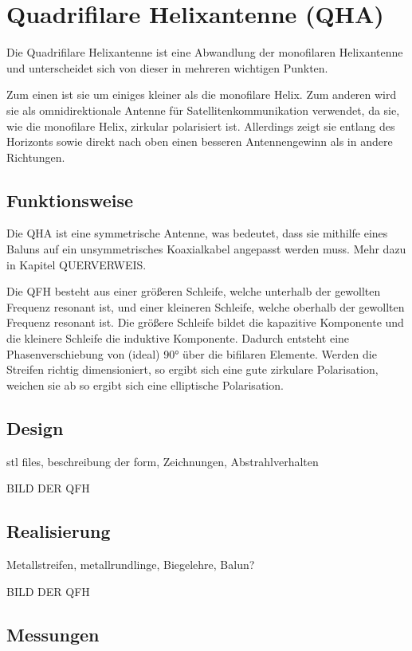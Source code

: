 \chapter{Quadrifilare Helixantenne (QHA)}
Die Quadrifilare Helixantenne ist eine Abwandlung der monofilaren Helixantenne und unterscheidet sich von dieser in mehreren wichtigen Punkten.

Zum einen ist sie um einiges kleiner als die monofilare Helix. Zum anderen wird sie als omnidirektionale Antenne für Satellitenkommunikation verwendet, da sie, wie die monofilare Helix, zirkular polarisiert ist. Allerdings zeigt sie entlang des Horizonts sowie direkt nach oben einen besseren Antennengewinn als in andere Richtungen.

\section{Funktionsweise}
Die QHA ist eine symmetrische Antenne, was bedeutet, dass sie mithilfe eines Baluns auf ein unsymmetrisches Koaxialkabel angepasst werden muss. Mehr dazu in Kapitel QUERVERWEIS.

Die QFH besteht aus einer größeren Schleife, welche unterhalb der gewollten Frequenz resonant ist, und einer kleineren Schleife, welche oberhalb der gewollten Frequenz resonant ist. Die größere Schleife bildet die kapazitive Komponente und die kleinere Schleife die induktive Komponente. Dadurch entsteht eine Phasenverschiebung von (ideal) 90° über die bifilaren Elemente. Werden die Streifen richtig dimensioniert, so ergibt sich eine gute zirkulare Polarisation, weichen sie ab so ergibt sich eine elliptische Polarisation.

\section{Design}
stl files, beschreibung der form, Zeichnungen, Abstrahlverhalten 

BILD DER QFH

\section{Realisierung}
Metallstreifen, metallrundlinge, Biegelehre, Balun?

BILD DER QFH

\section{Messungen}

